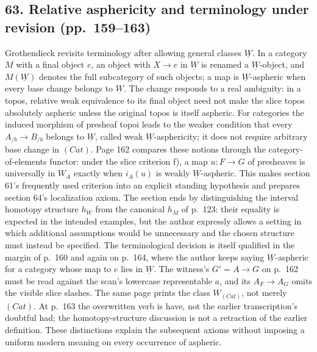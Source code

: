 \documentclass[10pt,oneside]{book}
\begin{document}
\subsection*{63. Relative asphericity and terminology under revision (pp.~159--163)}
Grothendieck revisits terminology after allowing general classes $\underline W$. In a category $M$ with a final object $e$, an object with $X\to e$ in $\underline W$ is renamed a $\underline W$-object, and $M(\underline W)$ denotes the full subcategory of such objects; a map is $\underline W$-aspheric when every base change belongs to $\underline W$. The change responds to a real ambiguity: in a topos, relative weak equivalence to its final object need not make the slice topos absolutely aspheric unless the original topos is itself aspheric. For categories the induced morphism of presheaf topoi leads to the weaker condition that every $A_{/b}\to B_{/b}$ belongs to $\underline W$, called weak $\underline W$-asphericity; it does not require arbitrary base change in $(Cat)$. Page 162 compares these notions through the category-of-elements functor: under the slice criterion f), a map $u:F\to G$ of presheaves is universally in $W_A$ exactly when $i_A(u)$ is weakly $\underline W$-aspheric. This makes section 61's frequently used criterion into an explicit standing hypothesis and prepares section 64's localization axiom. The section ends by distinguishing the interval homotopy structure $h_W$ from the canonical $h_M$ of p.~123: their equality is expected in the intended examples, but the author expressly allows a setting in which additional assumptions would be unnecessary and the chosen structure must instead be specified. The terminological decision is itself qualified in the margin of p.~160 and again on p.~164, where the author keeps saying $\underline W$-aspheric for a category whose map to $e$ lies in $\underline W$. The witness's $G'=A\to G$ on p.~162 must be read against the scan's lowercase representable $a$, and its $A_F\to A_G$ omits the visible slice slashes. The same page prints the class $W_{(Cat)}$, not merely $(Cat)$. At p.~163 the overwritten verb is have, not the earlier transcription's doubtful had; the homotopy-structure discussion is not a retraction of the earlier definition. These distinctions explain the subsequent axioms without imposing a uniform modern meaning on every occurrence of aspheric.
\end{document}
